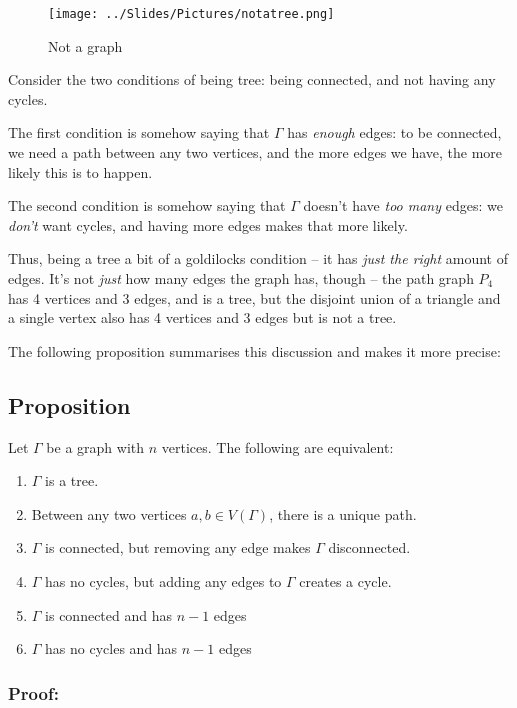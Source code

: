 \documentclass[]{article}
\providecommand{\tightlist}{%
  \setlength{\itemsep}{0pt}\setlength{\parskip}{0pt}}
\begin{document}
\begin{figure}[htbp]
\centering
\texttt{[image: ../Slides/Pictures/notatree.png]}
\caption{Not a graph}
\end{figure}

Consider the two conditions of being tree: being connected, and not
having any cycles.

The first condition is somehow saying that \(\Gamma\) has \emph{enough}
edges: to be connected, we need a path between any two vertices, and the
more edges we have, the more likely this is to happen.

The second condition is somehow saying that \(\Gamma\) doesn't have
\emph{too many} edges: we \emph{don't} want cycles, and having more
edges makes that more likely.

Thus, being a tree a bit of a goldilocks condition -- it has \emph{just
the right} amount of edges. It's not \emph{just} how many edges the
graph has, though -- the path graph \(P_4\) has 4 vertices and 3 edges,
and is a tree, but the disjoint union of a triangle and a single vertex
also has 4 vertices and 3 edges but is not a tree.

The following proposition summarises this discussion and makes it more
precise:

\subsection{Proposition}\label{proposition-1}

Let \(\Gamma\) be a graph with \(n\) vertices. The following are
equivalent:

\begin{enumerate}
\def\labelenumi{\arabic{enumi}.}
\tightlist
\item
  \(\Gamma\) is a tree.
\item
  Between any two vertices \(a,b\in V(\Gamma)\), there is a unique path.
\item
  \(\Gamma\) is connected, but removing any edge makes \(\Gamma\)
  disconnected.
\item
  \(\Gamma\) has no cycles, but adding any edges to \(\Gamma\) creates a
  cycle.
\item
  \(\Gamma\) is connected and has \(n-1\) edges
\item
  \(\Gamma\) has no cycles and has \(n-1\) edges
\end{enumerate}

\subsubsection{Proof:}\label{proof-6}
\end{document}
